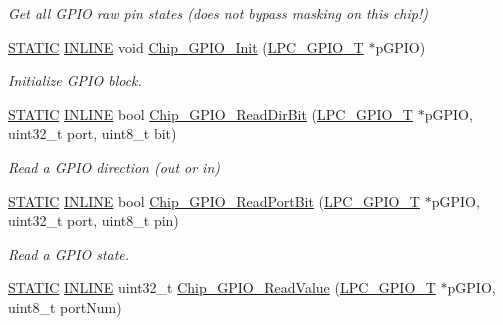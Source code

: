 \begin{DoxyCompactItemize}
\begin{DoxyCompactList}\small\item\em Get all G\+P\+IO raw pin states (does not bypass masking on this chip!) \end{DoxyCompactList}\item 
\hyperlink{group__LPC__Types__Public__Macros_ga10b2d890d871e1489bb02b7e70d9bdfb}{S\+T\+A\+T\+IC} \hyperlink{group__LPC__Types__Public__Types_ga2eb6f9e0395b47b8d5e3eeae4fe0c116}{I\+N\+L\+I\+NE} void \hyperlink{group__GPIO__17XX__40XX_gaeaca39372c8ff9f288243a20dd2259ce}{Chip\+\_\+\+G\+P\+I\+O\+\_\+\+Init} (\hyperlink{structLPC__GPIO__T}{L\+P\+C\+\_\+\+G\+P\+I\+O\+\_\+T} $\ast$p\+G\+P\+IO)
\begin{DoxyCompactList}\small\item\em Initialize G\+P\+IO block. \end{DoxyCompactList}\item 
\hyperlink{group__LPC__Types__Public__Macros_ga10b2d890d871e1489bb02b7e70d9bdfb}{S\+T\+A\+T\+IC} \hyperlink{group__LPC__Types__Public__Types_ga2eb6f9e0395b47b8d5e3eeae4fe0c116}{I\+N\+L\+I\+NE} bool \hyperlink{group__GPIO__17XX__40XX_ga8f436d49d7737db583aa4e71bc21937b}{Chip\+\_\+\+G\+P\+I\+O\+\_\+\+Read\+Dir\+Bit} (\hyperlink{structLPC__GPIO__T}{L\+P\+C\+\_\+\+G\+P\+I\+O\+\_\+T} $\ast$p\+G\+P\+IO, uint32\+\_\+t port, uint8\+\_\+t bit)
\begin{DoxyCompactList}\small\item\em Read a G\+P\+IO direction (out or in) \end{DoxyCompactList}\item 
\hyperlink{group__LPC__Types__Public__Macros_ga10b2d890d871e1489bb02b7e70d9bdfb}{S\+T\+A\+T\+IC} \hyperlink{group__LPC__Types__Public__Types_ga2eb6f9e0395b47b8d5e3eeae4fe0c116}{I\+N\+L\+I\+NE} bool \hyperlink{group__GPIO__17XX__40XX_ga74ca55b747c3a51c1ae3e47645da0c75}{Chip\+\_\+\+G\+P\+I\+O\+\_\+\+Read\+Port\+Bit} (\hyperlink{structLPC__GPIO__T}{L\+P\+C\+\_\+\+G\+P\+I\+O\+\_\+T} $\ast$p\+G\+P\+IO, uint32\+\_\+t port, uint8\+\_\+t pin)
\begin{DoxyCompactList}\small\item\em Read a G\+P\+IO state. \end{DoxyCompactList}\item 
\hyperlink{group__LPC__Types__Public__Macros_ga10b2d890d871e1489bb02b7e70d9bdfb}{S\+T\+A\+T\+IC} \hyperlink{group__LPC__Types__Public__Types_ga2eb6f9e0395b47b8d5e3eeae4fe0c116}{I\+N\+L\+I\+NE} uint32\+\_\+t \hyperlink{group__GPIO__17XX__40XX_gaadfa7274313165ae6dec004a125a1bcf}{Chip\+\_\+\+G\+P\+I\+O\+\_\+\+Read\+Value} (\hyperlink{structLPC__GPIO__T}{L\+P\+C\+\_\+\+G\+P\+I\+O\+\_\+T} $\ast$p\+G\+P\+IO, uint8\+\_\+t port\+Num)

\end{DoxyCompactItemize}
